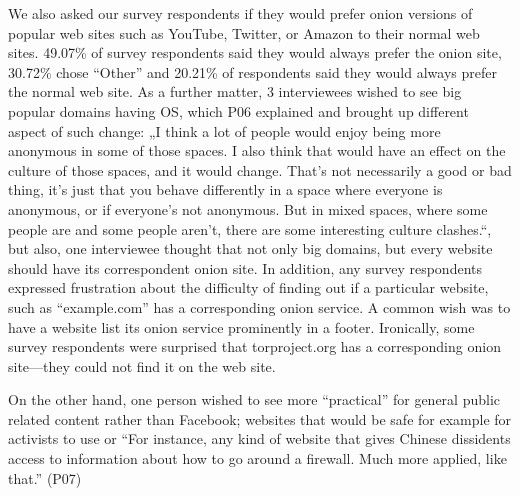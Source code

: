 We also asked our survey respondents if they would prefer onion versions of popular web sites such as
YouTube, Twitter, or Amazon to their normal web
sites. 49.07\% of survey respondents said they
would always prefer the onion site, 30.72\% chose ``Other'' and 20.21\% of
respondents said they would always prefer the normal web site. As a further matter, 3 interviewees wished to see big popular domains having OS, which P06 explained and brought up different aspect of such change: „I think a lot of people would enjoy being more anonymous in some of those spaces. I also think that would have an effect on the culture of those spaces, and it would change. That's not necessarily a good or bad thing, it's just that you behave differently in a space where everyone is anonymous, or if everyone's not anonymous. But in mixed spaces, where some people are and some people aren't, there are some interesting culture clashes.“, but also, one interviewee thought that not only big domains, but every website should have its correspondent onion site. In addition, any survey respondents expressed frustration about the difficulty of finding out if a particular website, such as 
``example.com'' has a corresponding onion service.  A common wish was to have
a website list its onion service prominently in a footer.  Ironically, some
survey respondents were surprised that torproject.org has a corresponding onion
site---they could not find it on the web site.


 On the other hand, one person wished to see more “practical” for general public related content rather than Facebook; websites that would be safe for example for activists to use or “For instance, any kind of website that gives Chinese dissidents access to information about how to go around a firewall. Much more applied, like that.” (P07)

